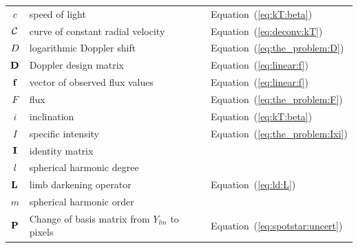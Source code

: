 \documentclass[modern]{aastex631}
\begin{document}
\begin{center}
\begin{longtable}{cll}
        $c$                                                 & speed of light                                               & Equation~(\ref{eq:kT:beta})                \\
        $\mathcal{C}$                                            & curve of constant radial velocity                            & Equation~(\ref{eq:deconv:kT})              \\
        $D$                                                & logarithmic Doppler shift                                    & Equation~(\ref{eq:the_problem:D})          \\
        ${\mathbf{D}}$                                          & Doppler design matrix                                        & Equation~(\ref{eq:linear:f})               \\
        ${\mathbf{f}}$                                          & vector of observed flux values                               & Equation~(\ref{eq:linear:f})               \\
        $F$                                                 & flux                                                         & Equation~(\ref{eq:the_problem:F})          \\
        $i$                                                 & inclination                                                  & Equation~(\ref{eq:kT:beta})                \\
        $I$                                                 & specific intensity                                           & Equation~(\ref{eq:the_problem:Ixi})        \\
        ${\mathbf{I}}$                                          & identity matrix                                              &                                            \\
        $l$                                                 & spherical harmonic degree                                    &                                            \\
        ${\mathbf{L}}$                                          & limb darkening operator                                      & Equation~(\ref{eq:ld:L})                   \\
        $m$                                                 & spherical harmonic order                                     &                                            \\
        ${\mathbf{P}}$                                          & Change of basis matrix from $Y_{lm}$ to pixels               & Equation~(\ref{eq:spotstar:uncert})        \\

\end{longtable}
\end{center}
\end{document}
